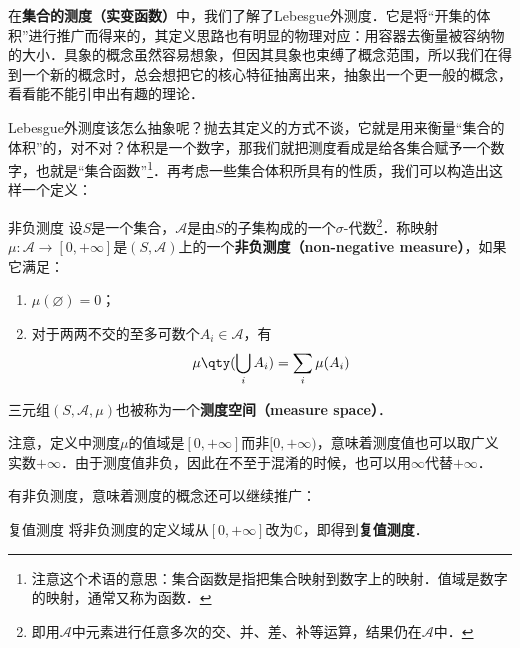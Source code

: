 

在\textbf{集合的测度（实变函数）}中，我们了解了Lebesgue外测度．它是将“开集的体积”进行推广而得来的，其定义思路也有明显的物理对应：用容器去衡量被容纳物的大小．具象的概念虽然容易想象，但因其具象也束缚了概念范围，所以我们在得到一个新的概念时，总会想把它的核心特征抽离出来，抽象出一个更一般的概念，看看能不能引申出有趣的理论．

Lebesgue外测度该怎么抽象呢？抛去其定义的方式不谈，它就是用来衡量“集合的体积”的，对不对？体积是一个数字，那我们就把测度看成是给各集合赋予一个数字，也就是“集合函数”\footnote{注意这个术语的意思：集合函数是指把集合映射到数字上的映射．值域是数字的映射，通常又称为函数．}．再考虑一些集合体积所具有的性质，我们可以构造出这样一个定义：

\begin{definition}{非负测度}\label{GenFun_def1}
设$S$是一个集合，$\mathcal{A}$是由$S$的子集构成的一个$\sigma$-代数\footnote{即用$\mathcal{A}$中元素进行任意多次的交、并、差、补等运算，结果仍在$\mathcal{A}$中．}．称映射$\mu:\mathcal{A}\to [0, +\infty]$是$(S, \mathcal{A})$上的一个\textbf{非负测度（non-negative measure）}，如果它满足：
\begin{enumerate}
\item $\mu(\varnothing)=0$；\\
\item 对于两两不交的至多可数个$A_i\in\mathcal{A}$，有
\begin{equation}
\mu\qty(\bigcup_i A_i) = \sum_i \mu(A_i)
\end{equation}
\end{enumerate}


三元组$(S, \mathcal{A}, \mu)$也被称为一个\textbf{测度空间（measure space）}．

\end{definition}

注意，定义中测度$\mu$的值域是$[0, +\infty]$而非$[0, +\infty)$，意味着测度值也可以取广义实数$+\infty$．由于测度值非负，因此在不至于混淆的时候，也可以用$\infty$代替$+\infty$．

有非负测度，意味着测度的概念还可以继续推广：

\begin{definition}{复值测度}
将非负测度的定义域从$[0, +\infty]$改为$\mathbb{C}$，即得到\textbf{复值测度}．
\end{definition}

